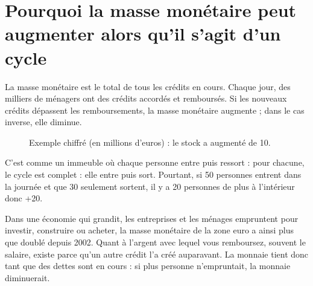 \documentclass[11pt,a4paper]{article}
\begin{document}
\section{Pourquoi la masse monétaire peut augmenter alors qu'il s'agit d'un cycle}

La masse monétaire est le total de tous les crédits en cours. Chaque jour, des milliers de ménagers ont des crédits accordés et remboursés. Si les nouveaux crédits dépassent les remboursements, la masse monétaire augmente ; dans le cas inverse, elle diminue.


\begin{figure}[htbp]
\centering
{}
\caption{Exemple chiffré (en millions d'euros) :  le stock a augmenté de 10.}
\label{fig:stock}
\end{figure}

C'est comme un immeuble où chaque personne entre puis ressort : pour chacune, le cycle est complet : elle entre puis sort. Pourtant, si 50 personnes entrent dans la journée et que 30 seulement sortent, il y a 20 personnes de plus à l'intérieur donc +20.

Dans une économie qui grandit, les entreprises et les ménages empruntent pour investir, construire ou acheter, la masse monétaire de la zone euro a ainsi plus que doublé depuis 2002. Quant à l'argent avec lequel vous remboursez, souvent le salaire, existe parce qu'un autre crédit l'a créé auparavant. La monnaie tient donc tant que des dettes sont en cours : si plus personne n'empruntait, la monnaie diminuerait.
\end{document}
